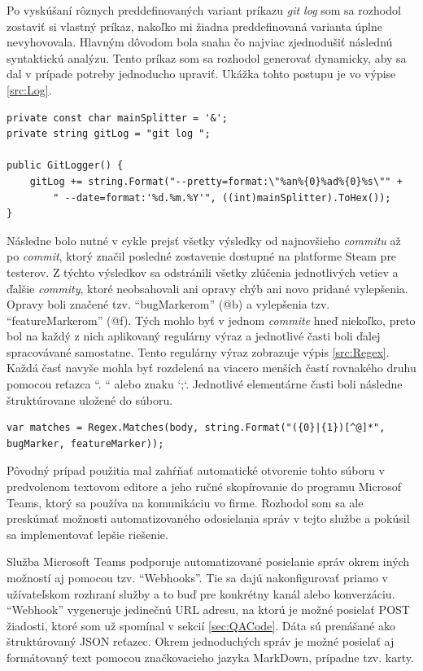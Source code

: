 \documentclass[slovak, bachelorpractice]{diploma}
\begin{document}
Po vyskúšaní rôznych preddefinovaných variant príkazu \textit{git log} som sa rozhodol zostaviť si vlastný príkaz, nakoľko mi žiadna preddefinovaná varianta úplne nevyhovovala. Hlavným dôvodom bola snaha čo najviac zjednodušiť následnú syntaktickú analýzu. Tento príkaz som sa rozhodol generovať dynamicky, aby sa dal v prípade potreby jednoducho upraviť. Ukážka tohto postupu je vo výpise \ref{src:Log}.
\vspace{10pt}
\begin{lstlisting}[label=src:Log,caption={Generovanie vlastného príkazu git log}]
private const char mainSplitter = '&';
private string gitLog = "git log ";

public GitLogger() {
    gitLog += string.Format("--pretty=format:\"%an%{0}%ad%{0}%s\"" +
        " --date=format:'%d.%m.%Y'", ((int)mainSplitter).ToHex());
}
\end{lstlisting}

Následne bolo nutné v cykle prejsť všetky výsledky od najnovšieho \textit{commitu} až po \textit{commit}, ktorý značil posledné zostavenie dostupné na platforme Steam pre testerov. Z týchto výsledkov sa odstránili všetky zlúčenia jednotlivých vetiev a ďalšie  \textit{commity}, ktoré neobsahovali ani opravy chýb ani novo pridané vylepšenia. Opravy boli značené tzv. \enquote{bugMarkerom} (@b) a vylepšenia tzv. \enquote{featureMarkerom} (@f). Tých mohlo byť v jednom \textit{commite} hneď niekoľko, preto bol na každý z nich aplikovaný regulárny výraz a jednotlivé časti boli ďalej spracovávané samostatne. Tento regulárny výraz zobrazuje výpis \ref{src:Regex}. Každá časť navyše mohla byť rozdelená na viacero menších častí rovnakého druhu pomocou reťazca ``. `` alebo znaku `;`. Jednotlivé elementárne časti boli následne štruktúrovane uložené do súboru.
\vspace{10pt}
\begin{lstlisting}[label=src:Regex,caption={Regulárny výraz na rozdelenie tela \textit{commitu}}]
var matches = Regex.Matches(body, string.Format("({0}|{1})[^@]*", bugMarker, featureMarker));
\end{lstlisting}

Pôvodný prípad použitia mal zahŕňať automatické otvorenie tohto súboru v predvolenom textovom editore a jeho ručné skopírovanie do programu Microsof Teams, ktorý sa používa na komunikáciu vo firme. Rozhodol som sa ale preskúmať možnosti automatizovaného odosielania správ v tejto službe a pokúsil sa implementovať lepšie riešenie.

Služba Microsoft Teams podporuje automatizované posielanie správ okrem iných možností aj pomocou tzv. \enquote{Webhooks}. Tie sa dajú nakonfigurovať priamo v užívateľskom rozhraní služby a to buď pre konkrétny kanál alebo konverzáciu. \enquote{Webhook} vygeneruje jedinečnú URL adresu, na ktorú je možné posielať POST žiadosti, ktoré som už spomínal v sekcií \ref{sec:QACode}. Dáta sú prenášané ako štruktúrovaný JSON reťazec. Okrem jednoduchých správ je možné posielať aj formátovaný text pomocou značkovacieho jazyka MarkDown, prípadne tzv. karty. 
\end{document}

